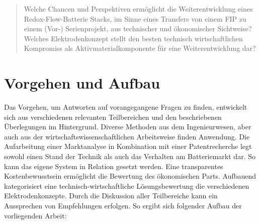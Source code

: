 \begin{quote}
    \glqq Welche Chancen und Perspektiven ermöglicht die Weiterentwicklung eines Redox-Flow-Batterie Stacks, im Sinne eines Transfers von einem \acf{FIP} zu einem (Vor-) Serienprojekt, aus technischer und ökonomischer Sichtweise?\\
    Welches Elektrodenkonzept stellt den besten technisch wirtschaftlichen Kompromiss als Aktivmaterialkomponente für eine Weiterentwicklung dar?\grqq
\end{quote}

\section*{Vorgehen und Aufbau}
Das Vorgehen, um Antworten auf vorangegangene Fragen zu finden, entwickelt sich aus verschiedenen relevanten Teilbereichen und den beschriebenen Überlegungen im Hintergrund. Diverse Methoden aus dem Ingenieurwesen, aber auch aus der wirtschaftswissenschaftlichen Arbeitsweise finden Anwendung. Die Aufarbeitung einer Marktanalyse in Kombination mit einer Patentrecherche legt sowohl einen Stand der Technik als auch das Verhalten am Batteriemarkt dar. So kann das eigene System in Relation gesetzt werden. Eine transparentes Kostenbewusstsein ermöglicht die Bewertung des ökonomischen Parts. Aufbauend kategorisiert eine technisch-wirtschaftliche Lösungsbewertung die verschiedenen Elektrodenkonzepte. Durch die Diskussion aller Teilbereiche kann ein Aussprechen von Empfehlungen erfolgen. So ergibt sich folgender Aufbau der vorliegenden Arbeit:


